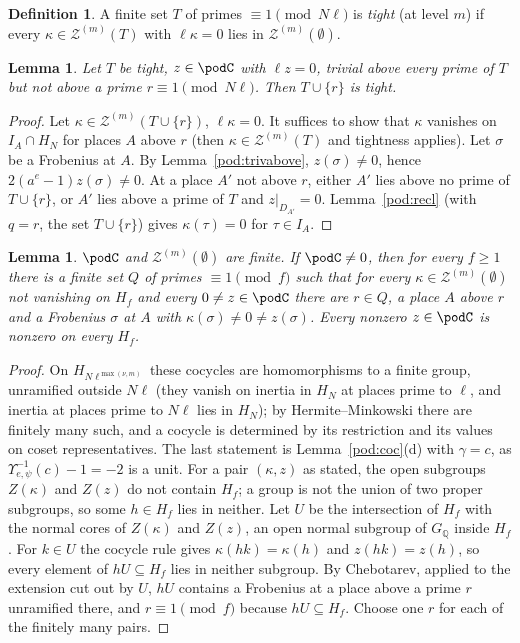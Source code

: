 \documentclass[10pt]{amsart}
\newtheorem{lemma}[theorem]{Lemma}
\theoremstyle{definition}
\newtheorem{definition}[theorem]{Definition}
\theoremstyle{remark}
\newcommand{\Q}{\mathbb Q}
\begin{document}
\begin{definition}\label{pod:def-tight}
A finite set $T$ of primes $\equiv1\pmod{N\ell}$ is \emph{tight} (at level $m$) if every $\kappa\in
\mathcal Z^{(m)}(T)$ with $\ell\kappa=0$ lies in $\mathcal Z^{(m)}(\emptyset)$.
\end{definition}

\begin{lemma}\label{pod:tight}
Let $T$ be tight, $z\in\podC$ with $\ell z=0$, trivial above every prime of $T$ but not above a prime
$r\equiv1\pmod{N\ell}$. Then $T\cup\{r\}$ is tight.
\end{lemma}
\begin{proof}
Let $\kappa\in\mathcal Z^{(m)}(T\cup\{r\})$, $\ell\kappa=0$. It suffices to show that $\kappa$
vanishes on $I_A\cap H_N$ for places $A$ above $r$ (then $\kappa\in\mathcal Z^{(m)}(T)$ and tightness
applies). Let $\sigma$ be a Frobenius at $A$. By Lemma~\ref{pod:trivabove}, $z(\sigma)\ne0$, hence
$2(a^e-1)z(\sigma)\ne0$. At a place $A'$ not above $r$, either $A'$ lies above no prime of $T\cup\{r\}$,
or $A'$ lies above a prime of $T$ and $z|_{D_{A'}}=0$. Lemma~\ref{pod:recl} (with $q=r$, the set
$T\cup\{r\}$) gives $\kappa(\tau)=0$ for $\tau\in I_A$.
\end{proof}

\begin{lemma}\label{pod:finite}
$\podC$ and $\mathcal Z^{(m)}(\emptyset)$ are finite. If $\podC\ne0$, then for every $f\ge1$ there is a
finite set $Q$ of primes $\equiv1\pmod f$ such that for every $\kappa\in\mathcal Z^{(m)}(\emptyset)$
not vanishing on $H_f$ and every $0\ne z\in\podC$ there are $r\in Q$, a place $A$ above $r$ and a
Frobenius $\sigma$ at $A$ with $\kappa(\sigma)\ne0\ne z(\sigma)$. Every nonzero $z\in\podC$ is
nonzero on every $H_f$.
\end{lemma}
\begin{proof}
On $H_{N\ell^{\max(\nu,m)}}$ these cocycles are homomorphisms to a finite group, unramified outside
$N\ell$ (they vanish on inertia in $H_N$ at places prime to $\ell$, and inertia at places prime to
$N\ell$ lies in $H_N$); by Hermite--Minkowski there are finitely many such, and a cocycle is determined
by its restriction and its values on coset representatives. The last statement is
Lemma~\ref{pod:coc}(d) with $\gamma=c$, as $\Upsilon_{e,\psi}^{-1}(c)-1=-2$ is a unit. For a pair
$(\kappa,z)$ as stated, the open subgroups $Z(\kappa)$ and $Z(z)$ do not contain $H_f$; a group is not
the union of two proper subgroups, so some $h\in H_f$ lies in neither. Let $U$ be the intersection of $H_f$ with the normal cores of
$Z(\kappa)$ and $Z(z)$, an open normal subgroup of $G_\Q$ inside $H_f$. For $k\in U$ the cocycle rule
gives $\kappa(hk)=\kappa(h)$ and $z(hk)=z(h)$, so every element of $hU\subseteq H_f$ lies in neither
subgroup. By Chebotarev, applied to the extension cut out by $U$, $hU$ contains a Frobenius at a place
above a prime $r$ unramified there, and $r\equiv1\pmod f$ because $hU\subseteq H_f$. Choose one $r$ for each of the
finitely many pairs.
\end{proof}
\end{document}
